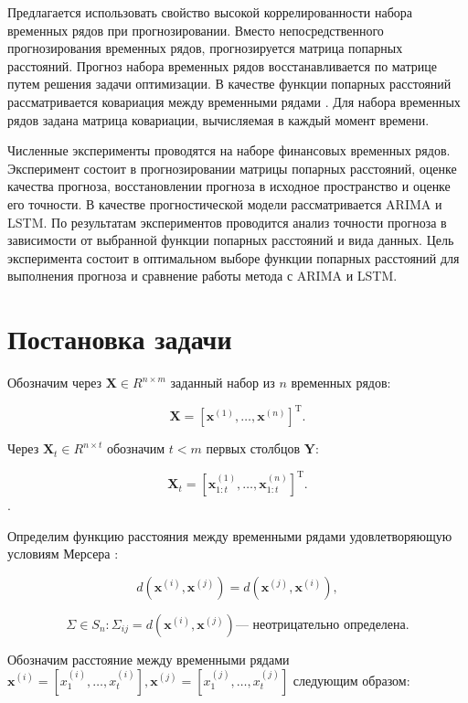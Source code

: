 \documentclass{article}
\begin{document}
Предлагается использовать свойство высокой коррелированности набора временных рядов при прогнозировании. Вместо непосредственного прогнозирования временных рядов, прогнозируется матрица попарных расстояний. Прогноз набора временных рядов восстанавливается по матрице путем решения задачи оптимизации. В качестве функции попарных расстояний рассматривается ковариация между временными рядами \cite{Boyd}. Для набора временных рядов задана матрица ковариации, вычисляемая в каждый момент времени.

Численные эксперименты проводятся на наборе финансовых временных рядов. Эксперимент состоит в прогнозировании матрицы попарных расстояний, оценке качества прогноза, восстановлении прогноза в исходное пространство и оценке его точности. В качестве прогностической модели рассматривается ARIMA и LSTM. По результатам экспериментов проводится анализ точности прогноза в зависимости от выбранной функции попарных расстояний и вида данных. Цель эксперимента состоит в оптимальном выборе функции попарных расстояний для выполнения прогноза и сравнение работы метода с ARIMA и LSTM.

\section{Постановка задачи}

Обозначим через  $\mathbf{X} \in R^{n \times m}$ заданный набор из $n$ временных рядов:

\begin{equation}
    \mathbf{X} = [\mathbf{x}^{(1)}, \ldots, \mathbf{x}^{(n)}]^\text{T}.
\end{equation}

 Через $\mathbf{X}_t \in R^{n \times t}$ обозначим $t < m$ первых столбцов $\mathbf{Y}$: 
 
 \begin{equation}
    \mathbf{X}_t = [\mathbf{x}_{1:t}^{(1)}, \ldots, \mathbf{x}_{1:t}^{(n)}]^\text{T}.
\end{equation}. 

Определим функцию расстояния между временными рядами
удовлетворяющую условиям Мерсера \cite{ghojogh2021reproducing}:

 \[d(\mathbf{x}^{(i)}, \mathbf{x}^{(j)}) = d(\mathbf{x}^{(j)}, \mathbf{x}^{(i)}),\]

 \[\Sigma \in S_n : \Sigma_{ij} = d(\mathbf{x}^{(i)}, \mathbf{x}^{(j)}) \text{--- неотрицательно определена.}\]
 

Обозначим расстояние между временными рядами $\mathbf{x}^{(i)} = [x_1^{(i)}, \ldots, x_t^{(i)}], \mathbf{x}^{(j)} = [x^{(j)}_1, \ldots, x^{(j)}_t]$ следующим образом:
\end{document}
